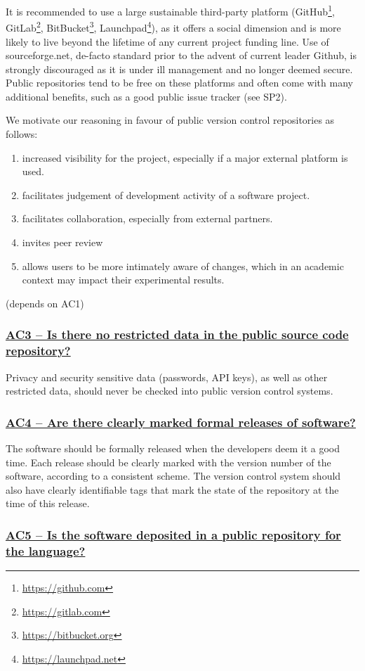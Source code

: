 \documentclass[a4paper,11pt]{article}
\newcommand{\indicator}[1]{\subsubsection*{\underline{#1}}}
\begin{document}
It is recommended to use a large sustainable third-party platform
(GitHub\footnote{\url{https://github.com}},
GitLab\footnote{\url{https://gitlab.com}},
BitBucket\footnote{\url{https://bitbucket.org}},
Launchpad\footnote{\url{https://launchpad.net}}), as it offers a social
dimension and is more likely to live beyond the lifetime of any current project
funding line. Use of sourceforge.net, de-facto standard prior to the advent of
current leader Github, is strongly discouraged as it is under ill management
and no longer deemed secure. Public repositories tend to be free on these platforms and
often come with many additional benefits, such as a good public issue tracker
(see SP2).

We motivate our reasoning in favour of public version control repositories as follows:

\begin{enumerate}
    \item increased visibility for the project, especially if a major external platform is used.
    \item facilitates judgement of development activity of a software project.
    \item facilitates collaboration, especially from external partners.
    \item invites peer review
    \item allows users to be more intimately aware of changes, which in an
        academic context may impact their experimental results.
\end{enumerate}

(depends on AC1)

\indicator{AC3 -- Is there no restricted data in the public source code repository?}

Privacy and security sensitive data (passwords, API keys), as well as other
restricted data, should never be checked into public version control systems.

\indicator{AC4 -- Are there clearly marked formal releases of software?}

The software should be formally released when the developers deem it a good
time. Each release should be clearly marked with the version number of the
software, according to a consistent scheme. The version control system should
also have clearly identifiable tags that mark the state of the repository at
the time of this release.


\indicator{AC5 -- Is the software deposited in a public repository for the language?}
\end{document}
